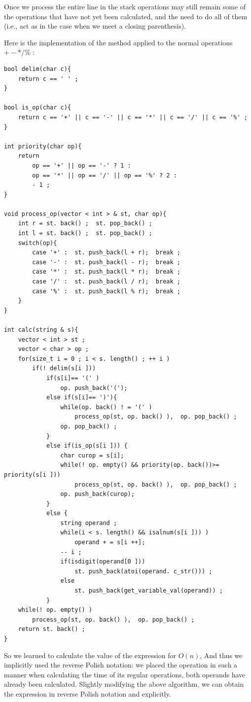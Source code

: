 Once we process the entire line in the stack operations may still remain some of the operations that have not yet been calculated, and the need to do all of them (i.e., act as in the case when we meet a closing parenthesis).

Here is the implementation of the method applied to the normal operations $+ - * / \%$ :

\begin{verbatim}
bool delim(char c){
    return c == ' ' ;
}
 
bool is_op(char c){
    return c == '+' || c == '-' || c == '*' || c == '/' || c == '%' ;
}
 
int priority(char op){
    return
        op == '+' || op == '-' ? 1 :
        op == '*' || op == '/' || op == '%' ? 2 :
        - 1 ;
}
 
void process_op(vector < int > & st, char op){
    int r = st. back() ;  st. pop_back() ;
    int l = st. back() ;  st. pop_back() ;
    switch(op){
        case '+' :  st. push_back(l + r);  break ;
        case '-' :  st. push_back(l - r);  break ;
        case '*' :  st. push_back(l * r);  break ;
        case '/' :  st. push_back(l / r);  break ;
        case '%' :  st. push_back(l % r);  break ;
    }
}
 
int calc(string & s){
    vector < int > st ;
    vector < char > op ;
    for(size_t i = 0 ; i < s. length() ; ++ i )
        if(! delim(s[i ]))
            if(s[i]== '(' )
                op. push_back('(');
            else if(s[i]== ')'){
                while(op. back() ! = '(' )
                    process_op(st, op. back() ),  op. pop_back() ;
                op. pop_back() ;
            }
            else if(is_op(s[i ])) {
                char curop = s[i];
                while(! op. empty() && priority(op. back())>= priority(s[i ]))
                    process_op(st, op. back() ),  op. pop_back() ;
                op. push_back(curop);
            }
            else {
                string operand ;
                while(i < s. length() && isalnum(s[i ])) )
                    operand + = s[i ++];
                -- i ;
                if(isdigit(operand[0 ]))
                    st. push_back(atoi(operand. c_str())) ;
                else
                    st. push_back(get_variable_val(operand)) ;
            }
    while(! op. empty() )
        process_op(st, op. back() ),  op. pop_back() ;
    return st. back() ;
} 
\end{verbatim}
So we learned to calculate the value of the expression for $O (n)$, And thus we implicitly used the reverse Polish notation: we placed the operation in such a manner when calculating the time of its regular operations, both operands have already been calculated. Slightly modifying the above algorithm, we can obtain the expression in reverse Polish notation and explicitly.

